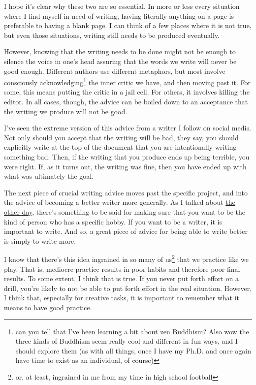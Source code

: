\documentclass[12pt]{article}
\renewcommand{\,}{\textsuperscript{,}}
\begin{document}
I hope it's clear why these two are so essential.  
In more or less every situation where I find myself in need of writing, having literally anything on a page is preferable to having a blank page.  
I can think of a few places where it is not true, but even those situations, writing still needs to be produced eventually.

However, knowing that the writing needs to be done might not be enough to silence the voice in one's head assuring that the words we write will never be good enough.  
Different authors use different metaphors, but most involve consciously acknowledging\footnote{can you tell that I've been learning a bit about zen Buddhism? Also wow the three kinds of Buddhism seem really cool and different in fun ways, and I should explore them (as with all things, once I have my Ph.D. and once again have time to exist as an individual, of course)} the inner critic we have, and then moving past it.  
For some, this means putting the critic in a jail cell.  
For others, it involves killing the editor.  
In all cases, though, the advice can be boiled down to an acceptance that the writing we produce will not be good.

I've seen the extreme version of this advice from a writer I follow on social media.  
Not only should you accept that the writing will be bad, they say, you should explicitly write at the top of the document that you are intentionally writing something bad.  
Then, if the writing that you produce ends up being terrible, you were right.  
If, as it turns out, the writing was fine, then you have ended up with what was ultimately the goal.

The next piece of crucial writing advice moves past the specific project, and into the advice of becoming a better writer more generally.  
As I talked about \href{optimizing-lifting}{the other day}, there's something to be said for making sure that you want to be the kind of person who has a specific hobby.  
If you want to be a writer, it is important to write.  
And so, a great piece of advice for being able to write better is simply to write more.

I know that there's this idea ingrained in so many of us\footnote{or, at least, ingrained in me from my time in high school football} that we practice like we play.  
That is, mediocre practice results in poor habits and therefore poor final results.  
To some extent, I think that is true.  
If you never put forth effort on a drill, you're likely to not be able to put forth effort in the real situation.  
However, I think that, especially for creative tasks, it is important to remember what it means to have good practice.
\end{document}
